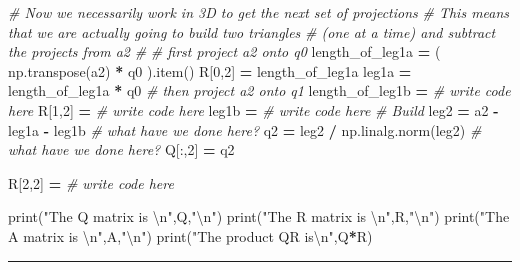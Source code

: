 \documentclass[
]{book}
\newenvironment{Shaded}{\begin{snugshade}}{\end{snugshade}}
\newcommand{\BuiltInTok}[1]{#1}
\newcommand{\CharTok}[1]{\textcolor[rgb]{0.31,0.60,0.02}{#1}}
\newcommand{\CommentTok}[1]{\textcolor[rgb]{0.56,0.35,0.01}{\textit{#1}}}
\newcommand{\DecValTok}[1]{\textcolor[rgb]{0.00,0.00,0.81}{#1}}
\newcommand{\NormalTok}[1]{#1}
\newcommand{\OperatorTok}[1]{\textcolor[rgb]{0.81,0.36,0.00}{\textbf{#1}}}
\newcommand{\StringTok}[1]{\textcolor[rgb]{0.31,0.60,0.02}{#1}}
\theoremstyle{definition}
\theoremstyle{definition}
\theoremstyle{definition}
\theoremstyle{remark}
\begin{document}
\begin{Shaded}
\begin{Highlighting}[]
\CommentTok{\# Now we necessarily work in 3D to get the next set of projections}
\CommentTok{\# This means that we are actually going to build two triangles }
\CommentTok{\# (one at a time) and subtract the projects from a2}
\CommentTok{\# }
\CommentTok{\# first project a2 onto q0}
\NormalTok{length\_of\_leg1a }\OperatorTok{=}\NormalTok{ ( np.transpose(a2) }\OperatorTok{*}\NormalTok{ q0 ).item() }
\NormalTok{R[}\DecValTok{0}\NormalTok{,}\DecValTok{2}\NormalTok{] }\OperatorTok{=}\NormalTok{ length\_of\_leg1a}
\NormalTok{leg1a }\OperatorTok{=}\NormalTok{ length\_of\_leg1a }\OperatorTok{*}\NormalTok{ q0}
\CommentTok{\# then project a2 onto q1}
\NormalTok{length\_of\_leg1b }\OperatorTok{=} \CommentTok{\# write code here}
\NormalTok{R[}\DecValTok{1}\NormalTok{,}\DecValTok{2}\NormalTok{] }\OperatorTok{=} \CommentTok{\# write code here}
\NormalTok{leg1b }\OperatorTok{=} \CommentTok{\# write code here}
\CommentTok{\# Build }
\NormalTok{leg2 }\OperatorTok{=}\NormalTok{ a2 }\OperatorTok{{-}}\NormalTok{ leg1a }\OperatorTok{{-}}\NormalTok{ leg1b }\CommentTok{\# what have we done here?}
\NormalTok{q2 }\OperatorTok{=}\NormalTok{ leg2 }\OperatorTok{/}\NormalTok{ np.linalg.norm(leg2) }\CommentTok{\# what have we done here?}
\NormalTok{Q[:,}\DecValTok{2}\NormalTok{] }\OperatorTok{=}\NormalTok{ q2}

\NormalTok{R[}\DecValTok{2}\NormalTok{,}\DecValTok{2}\NormalTok{] }\OperatorTok{=} \CommentTok{\# write code here}

\BuiltInTok{print}\NormalTok{(}\StringTok{"The Q matrix is }\CharTok{\textbackslash{}n}\StringTok{"}\NormalTok{,Q,}\StringTok{"}\CharTok{\textbackslash{}n}\StringTok{"}\NormalTok{)}
\BuiltInTok{print}\NormalTok{(}\StringTok{"The R matrix is }\CharTok{\textbackslash{}n}\StringTok{"}\NormalTok{,R,}\StringTok{"}\CharTok{\textbackslash{}n}\StringTok{"}\NormalTok{)}
\BuiltInTok{print}\NormalTok{(}\StringTok{"The A matrix is }\CharTok{\textbackslash{}n}\StringTok{"}\NormalTok{,A,}\StringTok{"}\CharTok{\textbackslash{}n}\StringTok{"}\NormalTok{)}
\BuiltInTok{print}\NormalTok{(}\StringTok{"The product QR is}\CharTok{\textbackslash{}n}\StringTok{"}\NormalTok{,Q}\OperatorTok{*}\NormalTok{R)}
\end{Highlighting}
\end{Shaded}

\begin{center}\rule{0.5\linewidth}{0.5pt}\end{center}
\end{document}
